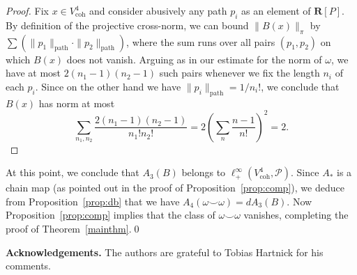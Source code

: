 \documentclass[11pt, a4paper]{amsart}
\newcommand{\RR}{\mathbf{R}}
\newcommand{\pathban}{\mathscr{P}}
\newcommand{\pathnorm}[1]{\|#1\|_\mathrm{path}}
\newcommand{\coh}[1]{V_\mathrm{coh}^{#1}}
\newcommand{\cp}{\mathbin{\smallsmile}}
\theoremstyle{plain}
\begin{document}
\begin{proof}
Fix $x\in \coh4$ and consider abusively any path $p_i$ as an element of $\RR[P]$. By definition of the projective cross-norm, we can bound $\|B(x) \|_\pi$ by $\sum (\pathnorm{p_1} \cdot \pathnorm{p_2} )$, where the sum runs over all pairs $(p_1, p_2)$ on which $B(x)$ does not vanish. Arguing as in our estimate for the norm of $\omega$, we have at most $2(n_1-1)(n_2-1)$ such pairs whenever we fix the length $n_i$ of each $p_i$.
Since on the other hand we have $\pathnorm{p_i}=1/n_i!$, we conclude that $B(x)$ has norm at most
%
\[\sum_{n_1, n_2} \frac{2(n_1-1)(n_2-1)}{n_1! n_2!} = 2 \left(\sum_n \frac{n-1}{n!}\right)^2 =2.\]
%
\end{proof}

At this point, we conclude that $A_3 (B)$ belongs to $\ell^\infty_+(\coh4, \pathban)$. Since $A_*$ is a chain map (as pointed out in the proof of Proposition~\ref{prop:comp}), we deduce from Proposition~\ref{prop:db} that we have $A_4 (\omega\cp\omega) = d A_3 (B)$. Now Proposition~\ref{prop:comp} implies that the class of $\omega\cp\omega$ vanishes, completing the proof of Theorem~\ref{mainthm}.\qed


\medskip
\noindent
\textbf{Acknowledgements.}
The authors are grateful to Tobias Hartnick for his comments.



%


\end{document}
